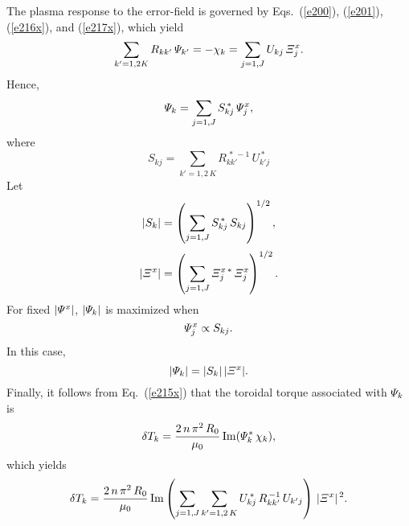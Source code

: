 \documentclass[12pt,prb,aps,notitlepage]{revtex4-1}
\begin{document}
The plasma response to the error-field is governed by Eqs.~(\ref{e200}), (\ref{e201}), (\ref{e216x}), and (\ref{e217x}),  which
yield
\begin{equation}\label{e281}
\sum_{k'=1,2K}R_{kk'}\,{\mit\Psi}_{k'} =-\chi_k= \sum_{j=1,J}U_{kj}\,{\mit\Xi}_j^x.
\end{equation}
Hence, 
\begin{equation}
{\mit\Psi}_k = \sum_{j=1,J} S^{\,\ast}_{kj}\,{\mit\Psi}_j^x,
\end{equation}
where
\begin{equation}
S_{kj} = \sum_{k'=1,2\,K} R^{\,\ast\,-1}_{kk'}\,U^{\,\ast}_{k'j}
\end{equation}
Let
\begin{align}
|S_k|& = \left(\sum_{j=1,J} S^{\,\ast}_{kj}\,S_{kj}\right)^{1/2},\\[0.5ex]
|{\mit\Xi}^x|& = \left(\sum_{j=1,J} {\mit\Xi}_j^{x\,\ast}\,{\mit\Xi}_j^x\right)^{1/2}.
\end{align}
For fixed $|{\mit\Psi}^x|$, $|{\mit\Psi}_k|$ is maximized when 
\begin{equation}
{\mit\Psi}_j^x \propto S_{kj}.
\end{equation}
In this case,
\begin{equation}
|{\mit\Psi}_k| = |S_k|\,|{\mit\Xi}^x|.
\end{equation}
Finally, it follows from Eq.~(\ref{e215x}) that the toroidal torque associated with ${\mit\Psi}_k$ is
\begin{equation}
\delta T_k = \frac{2\,n\,\pi^2\,R_0}{\mu_0}\,{\rm Im}({\mit\Psi}_k^\ast\,\chi_k),
\end{equation}
which yields
\begin{equation}
\delta T_k =  \frac{2\,n\,\pi^2\,R_0}{\mu_0}\,{\rm Im}\left(
\sum_{j=1,J}\sum_{k'=1,2\,K} U_{kj}^{\,\ast}\,R_{kk'}^{\,-1}\,U_{k'j}\right)\,|{\mit\Xi}^x|^{\,2}.
\end{equation}
\end{document}
